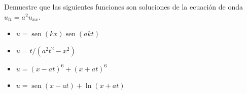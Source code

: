 \item Demuestre que las siguientes funciones son soluciones de la ecuación de onda $u_{tt} = a^2 u_{xx}$.
\begin{itemize}
    \item[(a)] $u = \operatorname{sen}(kx) \operatorname{sen}(akt)$
    \item[(b)] $u = t / (a^2t^2 - x^2)$
    \item[(c)] $u = (x-at)^6 + (x+at)^6$
    \item[(d)] $u = \operatorname{sen}(x-at) + \ln(x+at)$
\end{itemize}
